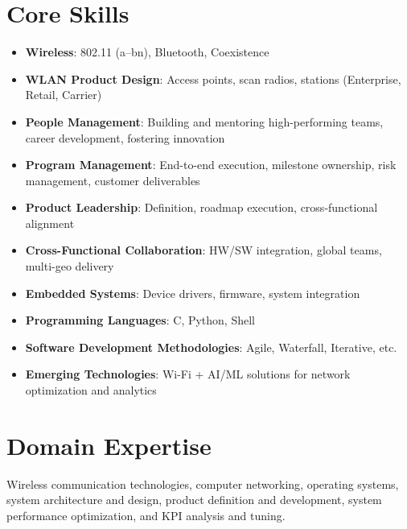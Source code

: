 \documentclass[a4paper,11pt]{article}
\begin{document}
\section*{Core Skills}
\begin{itemize}
    \item \textbf{Wireless}: 802.11 (a--bn), Bluetooth, Coexistence
    \item \textbf{WLAN Product Design}: Access points, scan radios, stations (Enterprise, Retail, Carrier)
    \item \textbf{People Management}: Building and mentoring high-performing teams, career development, fostering innovation
    \item \textbf{Program Management}: End-to-end execution, milestone ownership, risk management, customer deliverables
    \item \textbf{Product Leadership}: Definition, roadmap execution, cross-functional alignment
    \item \textbf{Cross-Functional Collaboration}: HW/SW integration, global teams, multi-geo delivery
    \item \textbf{Embedded Systems}: Device drivers, firmware, system integration
    \item \textbf{Programming Languages}: C, Python, Shell
    \item \textbf{Software Development Methodologies}: Agile, Waterfall, Iterative, etc.
    \item \textbf{Emerging Technologies}: Wi-Fi + AI/ML solutions for network optimization and analytics
\end{itemize}



\section*{Domain Expertise}
\begin{flushleft}
Wireless communication technologies, computer networking, operating systems, system architecture and design, product definition and development, system performance optimization, and KPI analysis and tuning.
\end{flushleft}



\end{document}
